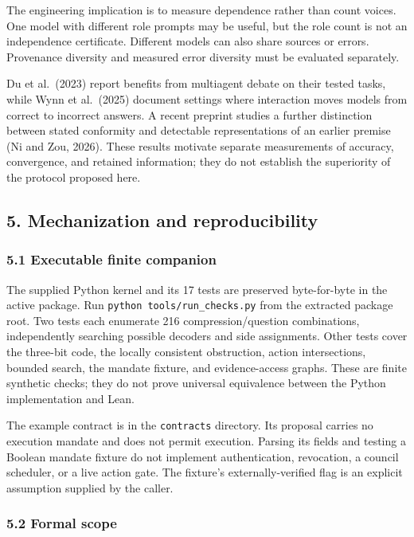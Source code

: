 \documentclass[
  10pt,
]{article}
\begin{document}
The engineering implication is to measure dependence rather than count voices. One model with different role prompts may be useful, but the role count is not an independence certificate. Different models can also share sources or errors. Provenance diversity and measured error diversity must be evaluated separately.

Du et al.~(2023) report benefits from multiagent debate on their tested tasks, while Wynn et al.~(2025) document settings where interaction moves models from correct to incorrect answers. A recent preprint studies a further distinction between stated conformity and detectable representations of an earlier premise (Ni and Zou, 2026). These results motivate separate measurements of accuracy, convergence, and retained information; they do not establish the superiority of the protocol proposed here.

\subsection{5. Mechanization and reproducibility}\label{mechanization-and-reproducibility}

\subsubsection{5.1 Executable finite companion}\label{executable-finite-companion}

The supplied Python kernel and its 17 tests are preserved byte-for-byte in the active package. Run \texttt{python\ tools/run\_checks.py} from the extracted package root. Two tests each enumerate 216 compression/question combinations, independently searching possible decoders and side assignments. Other tests cover the three-bit code, the locally consistent obstruction, action intersections, bounded search, the mandate fixture, and evidence-access graphs. These are finite synthetic checks; they do not prove universal equivalence between the Python implementation and Lean.

The example contract is in the \texttt{contracts} directory. Its proposal carries no execution mandate and does not permit execution. Parsing its fields and testing a Boolean mandate fixture do not implement authentication, revocation, a council scheduler, or a live action gate. The fixture's externally-verified flag is an explicit assumption supplied by the caller.

\subsubsection{5.2 Formal scope}\label{formal-scope}
\end{document}
